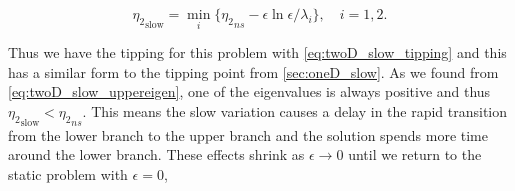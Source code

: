 \begin{equation}\label{eq:twoD_slow_tipping}
{\eta_2}_{\text{slow}}= \min\limits_i\{{\eta_2}_{ns}-\epsilon\ln\epsilon/\lambda_i\},\quad i=1,2.
\end{equation}

Thus we have the tipping for this problem with \eqref{eq:twoD_slow_tipping} and this has a similar form to the tipping point from \autoref{sec:oneD_slow}. As we found from \eqref{eq:twoD_slow_uppereigen}, one of the eigenvalues is always positive and thus ${\eta_2}_{\text{slow}}<{\eta_2}_{ns}$. This means the slow variation causes a delay in the rapid transition from the lower branch to the upper branch and the solution spends more time around the lower branch. These effects shrink as $\epsilon\to 0$ until we return to the static problem with $\epsilon=0$,

